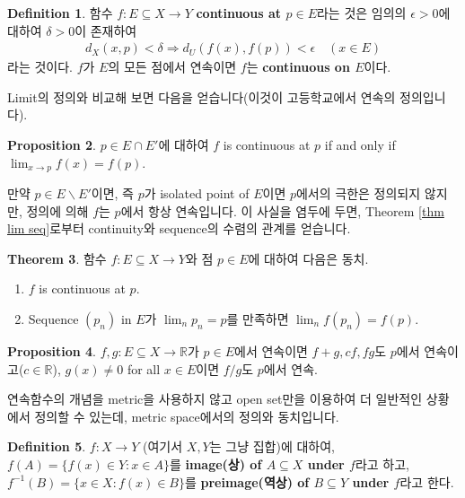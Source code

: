 \documentclass[12pt]{article}
\theoremstyle{definition}
\newtheorem{thm}{Theorem}[section]
\newtheorem{prop}[thm]{Proposition}
\newtheorem{defn}[thm]{Definition}
\def\RR{\mathbb{R}}
\def\eps{\epsilon}
\begin{document}
\begin{defn}
	함수 \(f: E \subseteq X \rightarrow Y\) \textbf{continuous at \(p \in E\)}라는 것은 임의의 \(\eps > 0\)에 대하여 \(\delta > 0\)이 존재하여
	\begin{gather*}
		d_X (x, p) < \delta \Longrightarrow d_U (f(x), f(p)) < \eps \quad (x \in E)
	\end{gather*}
	라는 것이다. \(f\)가 \(E\)의 모든 점에서 연속이면 \(f\)는 \textbf{continuous on \(E\)}이다.
\end{defn}

Limit의 정의와 비교해 보면 다음을 얻습니다(이것이 고등학교에서 연속의 정의입니다).

\begin{prop}
	\(p \in E \cap E'\)에 대하여 \(f\) is continuous at \(p\) if and only if \(\lim_{x \rightarrow p} f(x) = f(p)\).
\end{prop}

만약 \(p \in E \backslash E'\)이면, 즉 \(p\)가 isolated point of \(E\)이면 \(p\)에서의 극한은 정의되지 않지만, 정의에 의해 \(f\)는 \(p\)에서 항상 연속입니다. 이 사실을 염두에 두면, Theorem \ref{thm lim seq}로부터 continuity와 sequence의 수렴의 관계를 얻습니다.

\begin{thm} \label{conti seq}
	함수 \(f: E \subseteq X \rightarrow Y\)와 점 \(p \in E\)에 대하여 다음은 동치.
	\begin{enumerate}[label=(\alph*), leftmargin=2\parindent]
		\item
		\(f\) is continuous at \(p\).
		\item
		Sequence \((p_n)\) in \(E\)가 \(\lim_n p_n = p\)를 만족하면 \(\lim_n f(p_n) = f(p)\).
	\end{enumerate}
\end{thm}

\begin{prop}
	\(f, g : E \subseteq X \rightarrow \RR\)가 \(p \in E\)에서 연속이면 \(f+g, cf, fg\)도 \(p\)에서 연속이고(\(c \in \RR\)), \(g(x) \neq 0\) for all \(x \in E\)이면 \(f/g\)도 \(p\)에서 연속.
\end{prop}

연속함수의 개념을 metric을 사용하지 않고 open set만을 이용하여 더 일반적인 상황에서 정의할 수 있는데, metric space에서의 정의와 동치입니다.

\begin{defn}
	\(f: X \rightarrow Y\) (여기서 \(X, Y\)는 그냥 집합)에 대하여, \(f(A) = \{f(x) \in Y: x \in A\}\)를 \textbf{image(상) of \(A \subseteq X\) under \(f\)}라고 하고, \(f^{-1}(B) = \{x \in X: f(x) \in B\}\)를 \textbf{preimage(역상) of \(B \subseteq Y\) under \(f\)}라고 한다.
\end{defn}
\end{document}
